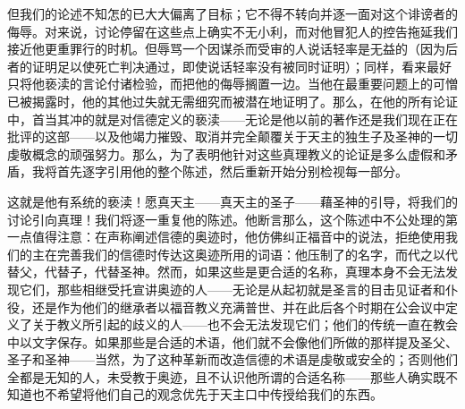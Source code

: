 但我们的论述不知怎的已大大偏离了目标；它不得不转向并逐一面对这个诽谤者的侮辱。对来说，讨论停留在这些点上确实不无小利，而对他冒犯人的控告拖延我们接近他更重罪行的时机。但辱骂一个因谋杀而受审的人说话轻率是无益的（因为后者的证明足以使死亡判决通过，即使说话轻率没有被同时证明）；同样，看来最好只将他亵渎的言论付诸检验，而把他的侮辱搁置一边。当他在最重要问题上的可憎已被揭露时，他的其他过失就无需细究而被潜在地证明了。那么，在他的所有论证中，首当其冲的就是对信德定义的亵渎——无论是他以前的著作还是我们现在正在批评的这部——以及他竭力摧毁、取消并完全颠覆关于天主的独生子及圣神的一切虔敬概念的顽强努力。那么，为了表明他针对这些真理教义的论证是多么虚假和矛盾，我将首先逐字引用他的整个陈述，然后重新开始分别检视每一部分。\par

这就是他有系统的亵渎！愿真天主——真天主的圣子——藉圣神的引导，将我们的讨论引向真理！我们将逐一重复他的陈述。他断言那么，这个陈述中不公处理的第一点值得注意：在声称阐述信德的奥迹时，他仿佛纠正福音中的说法，拒绝使用我们的主在完善我们的信德时传达这奥迹所用的词语：他压制了的名字，而代之以代替父，代替子，代替圣神。然而，如果这些是更合适的名称，真理本身不会无法发现它们，那些相继受托宣讲奥迹的人——无论是从起初就是圣言的目击见证者和仆役，还是作为他们的继承者以福音教义充满普世、并在此后各个时期在公会议中定义了关于教义所引起的歧义的人——也不会无法发现它们；他们的传统一直在教会中以文字保存。如果那些是合适的术语，他们就不会像他们所做的那样提及圣父、圣子和圣神——当然，为了这种革新而改造信德的术语是虔敬或安全的；否则他们全都是无知的人，未受教于奥迹，且不认识他所谓的合适名称——那些人确实既不知道也不希望将他们自己的观念优先于天主口中传授给我们的东西。\par

